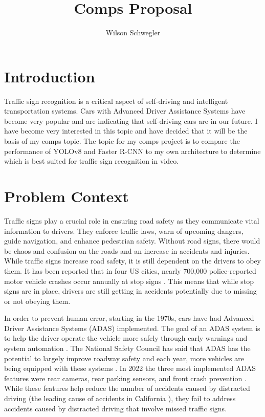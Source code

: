 \documentclass[10pt,twocolumn]{article}
\title{Comps Proposal}
\author{Wilson Schwegler}
\affiliation{Occidental College}
\begin{document}
\maketitle

\section{Introduction}
Traffic sign recognition is a critical aspect of self-driving and intelligent transportation systems. Cars with Advanced Driver Assistance Systems have become very popular and are indicating that self-driving cars are in our future. I have become very interested in this topic and have decided that it will be the basis of my comps topic. The topic for my comps project is to compare the performance of YOLOv8 and Faster R-CNN to my own architecture to determine which is best suited for traffic sign recognition in video.

\section{Problem Context}
Traffic signs play a crucial role in ensuring road safety as they communicate vital information to drivers. They enforce traffic laws, warn of upcoming dangers, guide navigation, and enhance pedestrian safety. Without road signs, there would be chaos and confusion on the roads and an increase in accidents and injuries. While traffic signs increase road safety, it is still dependent on the drivers to obey them. It has been reported that in four US cities, nearly 700,000 police-reported motor vehicle crashes occur annually at stop signs \textcite{NIH}. This means that while stop signs are in place, drivers are still getting in accidents potentially due to missing or not obeying them. 

In order to prevent human error, starting in the 1970s, cars have had Advanced Driver Assistance Systems (ADAS) implemented. The goal of an ADAS system is to help the driver operate the vehicle more safely through early warnings and system automation \textcite{HistoryofADAS}. The National Safety Council has said that ADAS has the potential to largely improve roadway safety and each year, more vehicles are being equipped with these systems \textcite{nsc}. In 2022 the three most implemented ADAS features were rear cameras, rear parking sensors, and front crash prevention \textcite{nsc2}. While these features help reduce the number of accidents caused by distracted driving (the leading cause of accidents in California \textcite{K}), they fail to address accidents caused by distracted driving that involve missed traffic signs. 
\end{document}
